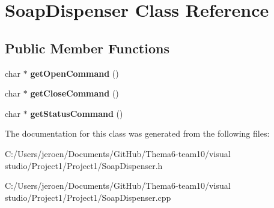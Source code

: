 \hypertarget{class_soap_dispenser}{}\section{Soap\+Dispenser Class Reference}
\label{class_soap_dispenser}
\subsection*{Public Member Functions}
\begin{DoxyCompactItemize}
\item 
char $\ast$ {\bfseries get\+Open\+Command} ()\hypertarget{class_soap_dispenser_a96d2229a526b99b68ca7784c12820a8e}{}\label{class_soap_dispenser_a96d2229a526b99b68ca7784c12820a8e}

\item 
char $\ast$ {\bfseries get\+Close\+Command} ()\hypertarget{class_soap_dispenser_a95857bee83a3a26caa30bdfac2872c48}{}\label{class_soap_dispenser_a95857bee83a3a26caa30bdfac2872c48}

\item 
char $\ast$ {\bfseries get\+Status\+Command} ()\hypertarget{class_soap_dispenser_a650fdf9c06456f931ca3574c7a63ad73}{}\label{class_soap_dispenser_a650fdf9c06456f931ca3574c7a63ad73}

\end{DoxyCompactItemize}


The documentation for this class was generated from the following files\+:\begin{DoxyCompactItemize}
\item 
C\+:/\+Users/jeroen/\+Documents/\+Git\+Hub/\+Thema6-\/team10/visual studio/\+Project1/\+Project1/Soap\+Dispenser.\+h\item 
C\+:/\+Users/jeroen/\+Documents/\+Git\+Hub/\+Thema6-\/team10/visual studio/\+Project1/\+Project1/Soap\+Dispenser.\+cpp\end{DoxyCompactItemize}
